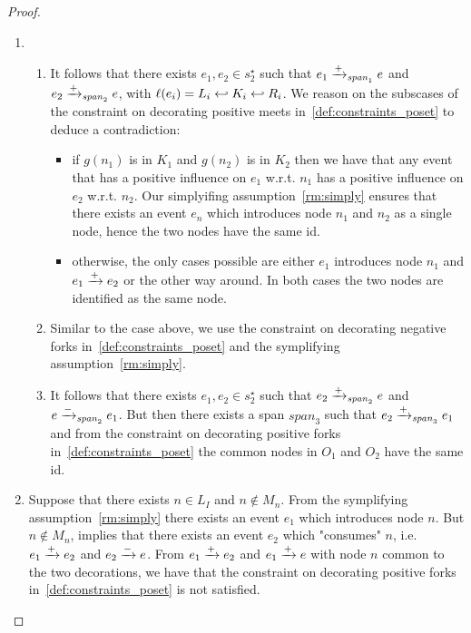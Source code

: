 \begin{proof}
  \begin{enumerate}
  \item
    \begin{enumerate}
    \item It follows that there exists $e_1,e_2\in s_2^{\star}$ such that $e_1\mathrel{\xrightarrow{+}}_{\mathit{span}_1} e$ and $e_2\mathrel{\xrightarrow{+}}_{\mathit{span}_2} e$, with $\ell(e_i) = L_i\hookleftarrow K_i\hookleftarrow R_i$. We reason on the subscases of the constraint on decorating positive meets in~\autoref{def:constraints_poset} to deduce a contradiction:
      \begin{itemize}
      \item if $g(n_1)$ is in $K_1$ and $g(n_2)$ is in $K_2$ then we have that any event that has a positive influence on $e_1$ w.r.t. $n_1$ has a positive influence on $e_2$ w.r.t. $n_2$. Our simplyifing assumption~\autoref{rm:simply} ensures that there exists an event $e_n$ which introduces node $n_1$ and $n_2$ as a single node, hence the two nodes have the same id.
      \item otherwise, the only cases possible are either $e_1$ introduces node $n_1$ and $e_1\mathrel{\xrightarrow{+}} e_2$ or the other way around. In both cases the two nodes are identified as the same node.
      \end{itemize}
    \item Similar to the case above, we use the constraint on decorating negative forks in~\autoref{def:constraints_poset} and the symplifying assumption~\autoref{rm:simply}.
    \item It follows that there exists $e_1,e_2\in s_2^{\star}$ such that $e_2\mathrel{\xrightarrow{+}}_{\mathit{span}_2} e$ and $e\mathrel{\xrightarrow{-}}_{\mathit{span}_2} e_1$. But then there exists a span ${\mathit{span}_3}$ such that $e_2\mathrel{\xrightarrow{+}}_{\mathit{span}_3} e_1$ and from the constraint on decorating positive forks in~\autoref{def:constraints_poset} the common nodes in $O_1$ and $O_2$ have the same id.
    \end{enumerate}
  \item Suppose that there exists $n\in L_I$ and $n\notin M_n$. From the symplifying assumption~\autoref{rm:simply} there exists an event $e_1$ which introduces node $n$. But $n\notin M_n$, implies that there exists an event $e_2$ which "consumes" $n$, i.e. $e_1\mathrel{\xrightarrow{+}} e_2$ and $e_2\mathrel{\xrightarrow{-}} e$. %
From $e_1\mathrel{\xrightarrow{+}} e_2$ and $e_1\mathrel{\xrightarrow{+}} e$ with node $n$ common to the two decorations, we have that the constraint on decorating positive forks in~\autoref{def:constraints_poset} is not satisfied.
  \end{enumerate}
\end{proof}

